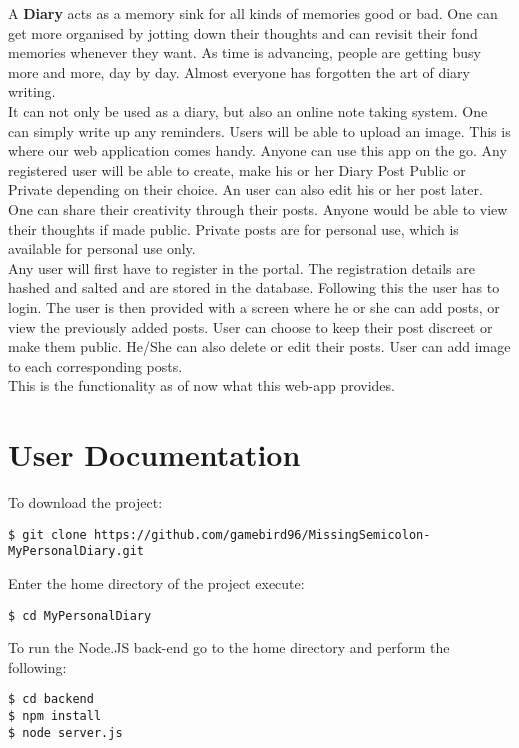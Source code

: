 \documentclass[runningheads]{llncs}
\begin{document}
    A \textbf{Diary} acts as a memory sink for all kinds of memories good or bad. One can get more organised by jotting down their thoughts and can revisit their fond memories whenever they want. As time is advancing, people are getting busy more and more, day by day. Almost everyone has forgotten the art of diary writing. \\
    It can not only be used as a diary, but also an online note taking system. One can simply write up any reminders. Users will be able to upload an image.  This is where our web application comes handy. Anyone can use this app on the go. Any registered user will be able to create, make his or her Diary Post Public or Private depending on their choice. An user can also edit his or her post later. 
    \\
    One can share their creativity through their posts. Anyone would be able to view their thoughts if made public. Private posts are for personal use, which is available for personal use only.
    \\
    Any user will first have to register in the portal. The registration details are hashed and salted and are stored in the database. Following this the user has to login. The user is then provided with a screen where he or she can add posts, or view the previously added posts. User can choose to keep their post discreet or make them public. He/She can also delete or edit their posts. User can add image to each corresponding posts.\\
    This is the functionality as of now what this web-app provides.
    

\section{User Documentation}

To download the project:
\begin{lstlisting}
$ git clone https://github.com/gamebird96/MissingSemicolon-MyPersonalDiary.git
\end{lstlisting}
\noindent
Enter the home directory of the project execute:

\begin{lstlisting}
$ cd MyPersonalDiary 
\end{lstlisting}
\noindent
To run the Node.JS back-end go to the home directory and perform the following:
\begin{lstlisting}
$ cd backend
$ npm install
$ node server.js
\end{lstlisting}
\noindent
\end{document}
